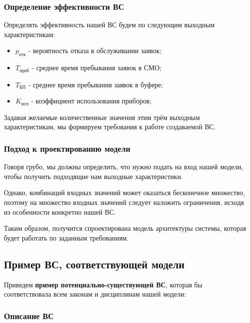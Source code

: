 \documentclass[a4paper, 14pt]{article}
\begin{document}
\subsubsection{Определение эффективности ВС}

Определять эффективность нашей ВС будем по следующим выходным характеристикам:

\begin{itemize}
	\item $p_\text{отк}$ - вероятность отказа в обслуживании заявок;
	\item $T_\text{преб}$ - среднее время пребывания заявок в СМО;
	\item $T_\text{БП}$ - среднее время пребывания заявок в буфере;
	\item $K_\text{исп}$ - коэффициент использования приборов;
\end{itemize}

Задавая желаемые количественные значения этим трём выходным характеристикам, мы формируем требования к работе создаваемой ВС.

\subsubsection{Подход к проектированию модели}

Говоря грубо, мы должны определить, что нужно подать на вход нашей модели, чтобы получить подходящие нам выходные характеристики.

Однако, комбинаций входных значений может оказаться бесконечное множество, поэтому на множество входных значений следует наложить ограничения, исходя из особенности конкретно нашей ВС.

Таким образом, получится спроектирована модель архитектуры системы, которая будет работать по заданным требованиям.

\subsection{Пример ВС, соответствующей модели}


Приведем \textbf{пример потенциально-существующей ВС}, которая бы соответствовала всем законам и дисциплинам нашей модели:


\subsubsection{Описание ВС}
\end{document}
